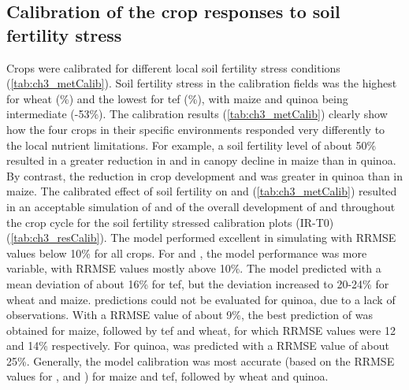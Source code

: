 \subsection{Calibration of the crop responses to soil fertility stress}
Crops were calibrated for different local soil fertility stress conditions (\autoref{tab:ch3_metCalib}). Soil fertility stress in the calibration fields was the highest for wheat (\%) and the lowest for tef (\%), with maize and quinoa being intermediate (-53\%). The calibration results (\autoref{tab:ch3_metCalib}) clearly show how the four crops in their specific environments responded very differently to the local nutrient limitations. For example, a soil fertility level \Brel of about 50\% resulted in a greater reduction in \WPster and in canopy decline in maize than in quinoa. By contrast, the reduction in crop development and \CCx was greater in quinoa than in maize. The calibrated effect of soil fertility on \CC and \WPster (\autoref{tab:ch3_metCalib}) resulted in an acceptable simulation of \SWCr and of the overall development of \CC and \B throughout the crop cycle for the soil fertility stressed calibration plots (IR-T0) (\autoref{tab:ch3_resCalib}). The model performed excellent in simulating \SWCr with RRMSE values below 10\% for all crops. For \CC and \B, the model performance was more variable, with RRMSE values mostly above 10\%. The model predicted \CC with a mean deviation of about 16\% for tef, but the deviation increased to 20-24\% for wheat and maize. \CC predictions could not be evaluated for quinoa, due to a lack of observations. With a RRMSE value of about 9\%, the best prediction of \B was obtained for maize, followed by tef and wheat, for which RRMSE values were 12 and 14\% respectively. For quinoa, \B was predicted with a RRMSE value of about 25\%. Generally, the model calibration was most accurate (based on the RRMSE values for \SWCr, \CC and \B) for maize and tef, followed by wheat and quinoa.

